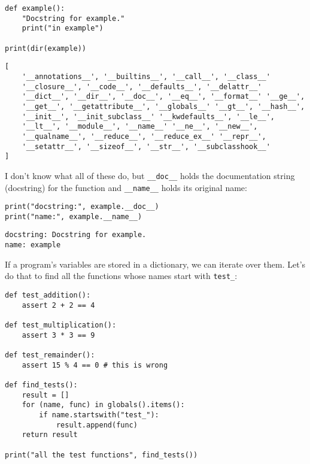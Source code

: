 \documentclass{scrbook}
\begin{document}
\begin{lstlisting}[frame=single,frameround=tttt]
def example():
    "Docstring for example."
    print("in example")

print(dir(example))
\end{lstlisting}

\begin{lstlisting}[frame=single,frameround=tttt]
[
    '__annotations__', '__builtins__', '__call__', '__class__'
    '__closure__', '__code__', '__defaults__', '__delattr__'
    '__dict__', '__dir__', '__doc__', '__eq__', '__format__' '__ge__',
    '__get__', '__getattribute__', '__globals__' '__gt__', '__hash__',
    '__init__', '__init_subclass__' '__kwdefaults__', '__le__',
    '__lt__', '__module__', '__name__' '__ne__', '__new__',
    '__qualname__', '__reduce__', '__reduce_ex__' '__repr__',
    '__setattr__', '__sizeof__', '__str__', '__subclasshook__'
]
\end{lstlisting}



I don't know what all of these do,
but \texttt{\_\_doc\_\_} holds the documentation string (docstring) for the function
and \texttt{\_\_name\_\_} holds its original name:


\begin{lstlisting}[frame=single,frameround=tttt]
print("docstring:", example.__doc__)
print("name:", example.__name__)
\end{lstlisting}

\begin{lstlisting}[frame=single,frameround=tttt]
docstring: Docstring for example.
name: example
\end{lstlisting}



If a program's variables are stored in a dictionary,
we can iterate over them.
Let's do that to find all the functions whose names start with \texttt{test\_}:


\begin{lstlisting}[frame=single,frameround=tttt]
def test_addition():
    assert 2 + 2 == 4

def test_multiplication():
    assert 3 * 3 == 9

def test_remainder():
    assert 15 % 4 == 0 # this is wrong

def find_tests():
    result = []
    for (name, func) in globals().items():
        if name.startswith("test_"):
            result.append(func)
    return result

print("all the test functions", find_tests())
\end{lstlisting}
\end{document}

